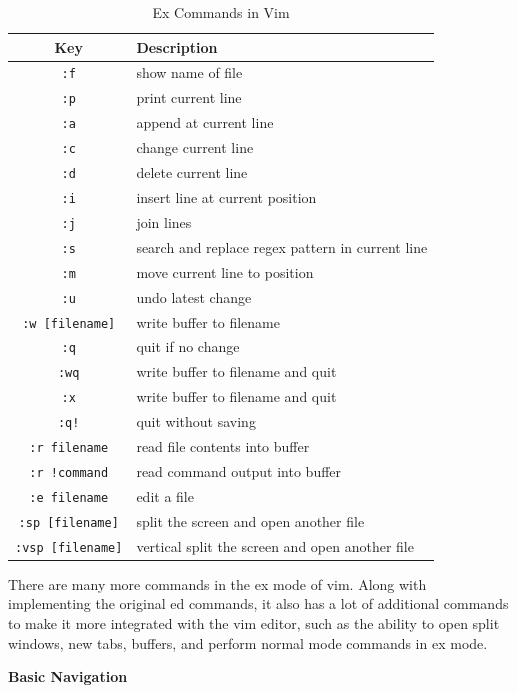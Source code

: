 \begin{table}[h!]
  \caption{Ex Commands in Vim}
  \begin{tabular}{c l}
    \toprule
    Key & Description \\
    \midrule
    \texttt{:f} & show name of file \\
    \texttt{:p} & print current line \\
    \texttt{:a} & append at current line \\
    \texttt{:c} & change current line \\
    \texttt{:d} & delete current line \\
    \texttt{:i} & insert line at current position \\
    \texttt{:j} & join lines \\
    \texttt{:s} & search and replace regex pattern in current line \\
    \texttt{:m} & move current line to position \\
    \texttt{:u} & undo latest change \\
    \texttt{:w [filename]} & write buffer to filename \\
    \texttt{:q} & quit if no change \\
    \texttt{:wq} & write buffer to filename and quit \\
    \texttt{:x} & write buffer to filename and quit \\
    \texttt{:q!} & quit without saving \\
    \texttt{:r filename} & read file contents into buffer \\
    \texttt{:r !command} & read command output into buffer \\
    \texttt{:e filename} & edit a file \\
    \texttt{:sp [filename]} & split the screen and open another file \\
    \texttt{:vsp [filename]} & vertical split the screen and open another file \\
    \bottomrule
  \end{tabular}
\end{table}

There are many more commands in the ex mode of vim.
Along with implementing the original ed commands, it
also has a lot of additional commands to make it more
integrated with the vim editor, such as the ability
to open split windows, new tabs, buffers, and perform
normal mode commands in ex mode.

\textbf{Basic Navigation}

